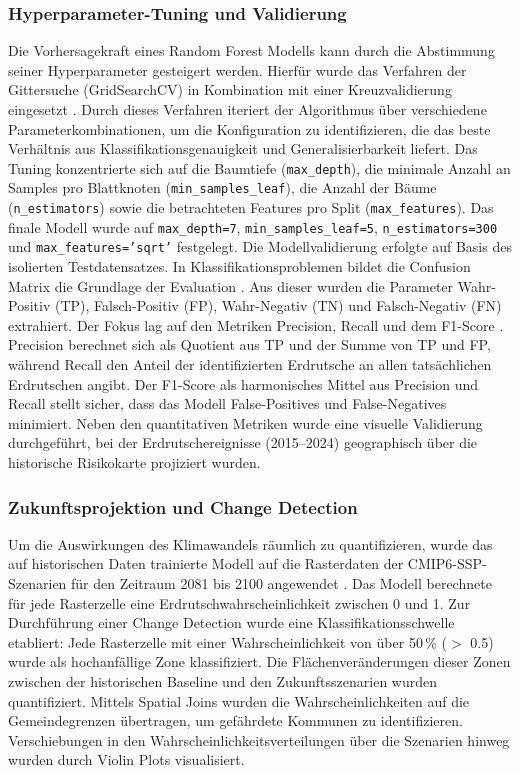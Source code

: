\documentclass[../main.tex]{subfiles}
\begin{document}
\subsubsection{Hyperparameter-Tuning und Validierung}
Die Vorhersagekraft eines Random Forest Modells kann durch die Abstimmung seiner Hyperparameter gesteigert werden.
Hierfür wurde das Verfahren der Gittersuche (GridSearchCV) in Kombination mit einer Kreuzvalidierung eingesetzt \autocite{pedregosaScikitlearnMachineLearning2011}.
Durch dieses Verfahren iteriert der Algorithmus über verschiedene Parameterkombinationen, um die Konfiguration zu identifizieren, die das beste Verhältnis aus Klassifikationsgenauigkeit und Generalisierbarkeit liefert.
Das Tuning konzentrierte sich auf die Baumtiefe (\texttt{max\_depth}), die minimale Anzahl an Samples pro Blattknoten (\texttt{min\_samples\_leaf}), die Anzahl der Bäume (\texttt{n\_estimators}) sowie die betrachteten Features pro Split (\texttt{max\_features}).
Das finale Modell wurde auf \texttt{max\_depth=7}, \texttt{min\_samples\_leaf=5}, \texttt{n\_estimators=300} und \texttt{max\_features='sqrt'} festgelegt.
Die Modellvalidierung erfolgte auf Basis des isolierten Testdatensatzes. In Klassifikationsproblemen bildet die Confusion Matrix die Grundlage der Evaluation \autocite{douAssessmentAdvancedRandom2019}.
Aus dieser wurden die Parameter Wahr-Positiv (TP), Falsch-Positiv (FP), Wahr-Negativ (TN) und Falsch-Negativ (FN) extrahiert.
Der Fokus lag auf den Metriken Precision, Recall und dem F1-Score \autocite{douAssessmentAdvancedRandom2019}.
Precision berechnet sich als Quotient aus TP und der Summe von TP und FP, während Recall den Anteil der identifizierten Erdrutsche an allen tatsächlichen Erdrutschen angibt.
Der F1-Score als harmonisches Mittel aus Precision und Recall stellt sicher, dass das Modell False-Positives und False-Negatives minimiert. Neben den quantitativen Metriken wurde eine visuelle Validierung durchgeführt, bei der Erdrutschereignisse (2015--2024) geographisch über die historische Risikokarte projiziert wurden.

\subsubsection{Zukunftsprojektion und Change Detection}
Um die Auswirkungen des Klimawandels räumlich zu quantifizieren, wurde das auf historischen Daten trainierte Modell auf die Rasterdaten der CMIP6-SSP-Szenarien für den Zeitraum 2081 bis 2100 angewendet \autocite{oneillScenarioModelIntercomparison2016}.
Das Modell berechnete für jede Rasterzelle eine Erdrutschwahrscheinlichkeit zwischen 0 und 1. Zur Durchführung einer Change Detection wurde eine Klassifikationsschwelle etabliert: Jede Rasterzelle mit einer Wahrscheinlichkeit von über 50\,\% ($>$ 0.5) wurde als hochanfällige Zone klassifiziert.
Die Flächenveränderungen dieser Zonen zwischen der historischen Baseline und den Zukunftsszenarien wurden quantifiziert.
Mittels Spatial Joins wurden die Wahrscheinlichkeiten auf die Gemeindegrenzen übertragen, um gefährdete Kommunen zu identifizieren.
Verschiebungen in den Wahrscheinlichkeitsverteilungen über die Szenarien hinweg wurden durch Violin Plots visualisiert.
\end{document}
